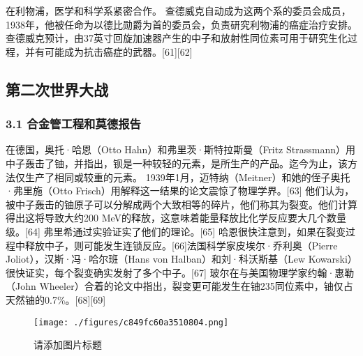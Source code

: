 在利物浦，医学和科学系紧密合作。 查德威克自动成为这两个系的委员会成员，1938年，他被任命为以德比勋爵为首的委员会，负责研究利物浦的癌症治疗安排。 查德威克预计，由37英寸回旋加速器产生的中子和放射性同位素可用于研究生化过程，并有可能成为抗击癌症的武器。[61][62]

\subsection{第二次世界大战}
\subsubsection{3.1 合金管工程和莫德报告}
在德国，奥托·哈恩（Otto Hahn）和弗里茨·斯特拉斯曼（Fritz Strassmann）用中子轰击了铀，并指出，钡是一种较轻的元素，是所生产的产品。迄今为止，该方法仅生产了相同或较重的元素。 1939年1月，迈特纳（Meitner）和她的侄子奥托·弗里施（Otto Frisch）用解释这一结果的论文震惊了物理学界。[63] 他们认为，被中子轰击的铀原子可以分解成两个大致相等的碎片，他们称其为裂变。他们计算得出这将导致大约200 MeV的释放，这意味着能量释放比化学反应要大几个数量级。[64] 弗里希通过实验证实了他们的理论。[65] 哈恩很快注意到，如果在裂变过程中释放中子，则可能发生连锁反应。[66]法国科学家皮埃尔·乔利奥（Pierre Joliot），汉斯·冯·哈尔班（Hans von Halban）和刘·科沃斯基（Lew Kowarski）很快证实，每个裂变确实发射了多个中子。[67] 玻尔在与美国物理学家约翰·惠勒（John Wheeler）合着的论文中指出，裂变更可能发生在铀235同位素中，铀仅占天然铀的0.7\%。[68][69]
\begin{figure}[ht]
\centering
\texttt{[image: ./figures/c849fc60a3510804.png]}
\caption{请添加图片标题} \label{fig_CHFR_5}
\end{figure}
